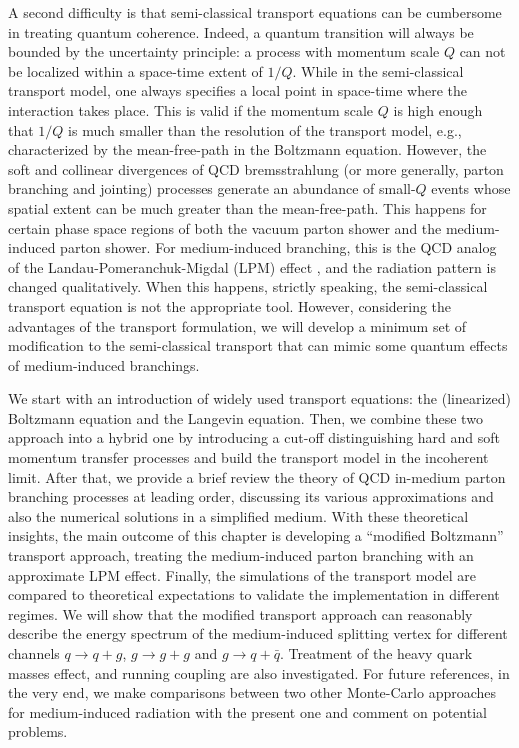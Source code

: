A second difficulty is that semi-classical transport equations can be cumbersome in treating quantum coherence.
Indeed, a quantum transition will always be bounded by the uncertainty principle: a process with momentum scale $Q$ can not be localized within a space-time extent of $1/Q$.
While in the semi-classical transport model, one always specifies a local point in space-time where the interaction takes place.
This is valid if the momentum scale $Q$ is high enough that $1/Q$ is much smaller than the resolution of the transport model, e.g., characterized by the mean-free-path in the Boltzmann equation.
However, the soft and collinear divergences of QCD bremsstrahlung (or more generally, parton branching and jointing) processes generate an abundance of small-$Q$ events whose spatial extent can be much greater than the mean-free-path. 
This happens for certain phase space regions of both the vacuum parton shower and the medium-induced parton shower.
For medium-induced branching, this is the QCD analog of the Landau-Pomeranchuk-Migdal (LPM) effect \cite{PhysRev.103.1811,Wang:1994fx,Zakharov:1996fv}, and the radiation pattern is changed qualitatively.
When this happens, strictly speaking, the semi-classical transport equation is not the appropriate tool.
However, considering the advantages of the transport formulation, we will develop a minimum set of modification to the semi-classical transport that can mimic some quantum effects of medium-induced branchings.

We start with an introduction of widely used transport equations: the (linearized) Boltzmann equation and the Langevin equation.
Then, we combine these two approach into a hybrid one by introducing a cut-off distinguishing hard and soft momentum transfer processes and build the transport model in the incoherent limit.
After that, we provide a brief review the theory of QCD in-medium parton branching processes at leading order, discussing its various approximations and also the numerical solutions in a simplified medium.
With these theoretical insights, the main outcome of this chapter is developing a ``modified Boltzmann'' transport approach, treating the medium-induced parton branching with an approximate LPM effect.
Finally, the simulations of the transport model are compared to theoretical expectations to validate the implementation in different regimes.
We will show that the modified transport approach can reasonably describe the energy spectrum of the medium-induced splitting vertex for different channels $q\rightarrow q+g$, $g\rightarrow g+g$ and $g\rightarrow q+\bar{q}$.
Treatment of the heavy quark masses effect, and running coupling are also  investigated.
For future references, in the very end, we make comparisons between two other Monte-Carlo approaches for medium-induced radiation with the present one and comment on potential problems.

